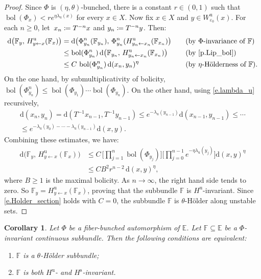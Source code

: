 \documentclass[10pt]{amsart}
\def\vcentcolon{\mathrel{\mathop\ordinarycolon}}
\providecommand\ordinarycolon{:}
\providecommand*\coloneqq{\vcentcolon\mathrel{\mkern-1.2mu}=}
\theoremstyle{plain}
\newtheorem{corollary}[theorem]{Corollary}
\theoremstyle{definition}
\newcommand{\EE}{\mathbb{E}}
\newcommand{\FF}{\mathbb{F}}
\newcommand{\dd}{\mathrm{d}}
\newcommand{\uu}{\mathrm{u}}
\renewcommand{\ss}{\mathrm{s}}
\DeclareMathOperator{\bol}{bol}
\let\epsilon\varepsilon
\begin{document}
\begin{proof}
Since $\Phi$ is $(\eta,\theta)$-bunched, there is a constant $r \in (0,1)$ such that $\bol(\Phi_x) < r e^{\eta \lambda_\uu(x)}$ for every $x \in X$.
Now fix $x \in X$ and $y \in W^\uu_{\epsilon_0}(x)$.
For each $n \ge 0$, let~\hbox{$x_n \coloneqq T^{-n} x$} and $y_n \coloneqq T^{-n} y$.
Then:
\begin{alignat*}{2}
\dd \big (\FF_y, \, H^\uu_{y \gets x} (\FF_x) \big)
&= \dd \big (\Phi^n_{y_n}(\FF_{y_n}), \, \Phi^n_{y_n} (H^\uu_{y_n \gets x_n} (\FF_{x_n}) \big) &\quad&\text{(by $\Phi$-invariance of $\FF$)}\\
&\le \bol(\Phi^n_{y_n}) \, \dd \big (\FF_{y_n}, \, H^\uu_{y_n \gets x_n} (\FF_{x_n}) \big) &\quad&\text{(by \cref{p.Lip_bol})}\\
&\le C \, \bol(\Phi^n_{y_n}) \, \dd(x_n,y_n)^{\eta}
&\quad&\text{(by $\eta$-Hölderness of $\FF$).}
\end{alignat*}
On the one hand, by submultiplicativity of bolicity, $\bol(\Phi^n_{y_n}) \le \bol(\Phi_{y_1}) \cdots \bol(\Phi_{y_n})$.
On the other hand, using \eqref{e.lambda_u} recursively,
\begin{multline*}
\dd(x_n,y_n) = \dd(T^{-1} x_{n-1}, T^{-1} y_{n-1}) \le e^{-\lambda_\uu(y_{n-1})} \dd(x_{n-1}, y_{n-1}) \le \cdots \\ \le e^{-\lambda_\uu(y_0) - \cdots -\lambda_\uu(y_{n-1})} \dd(x,y).
\end{multline*}
Combining these estimates, we have:
\begin{align*}
\dd \big (\FF_y, \, H^\uu_{y \gets x} (\FF_x) \big)
&\le C \, \biggl[ \prod_{j=1}^{n} \bol(\Phi_{y_j})\biggr] \biggl[ \prod_{j=0}^{n-1} e^{-\eta \lambda_\uu(y_j)} \biggr] \dd(x,y)^{\eta} \\
&\le C B^2 r^{n-2} \, \dd(x,y)^{\eta},
\end{align*}
where $B \ge 1$ is the maximal bolicity.
As $n \to \infty$, the right hand side tends to zero.
So $\FF_y = H^\uu_{y \gets x} (\FF_x)$, proving that the subbundle $\FF$ is $H^\uu$-invariant.
Since \eqref{e.Holder_section} holds with $C=0$, the subbundle $\FF$ is $\theta$-Hölder along unstable sets.
\end{proof}

\begin{corollary}\label{c.irred}
Let $\Phi$ be a fiber-bunched automorphism of $\EE$.
Let $\FF \subseteq \EE$ be a $\Phi$-invariant continuous subbundle.
Then the following conditions are equivalent:
\begin{enumerate}
\item\label{i.irred1}
$\FF$ is a $\theta$-Hölder subbundle;
\item\label{i.irred2}
$\FF$ is both $H^\uu$- and $H^\ss$-invariant.
\end{enumerate}
\end{corollary}
\end{document}
